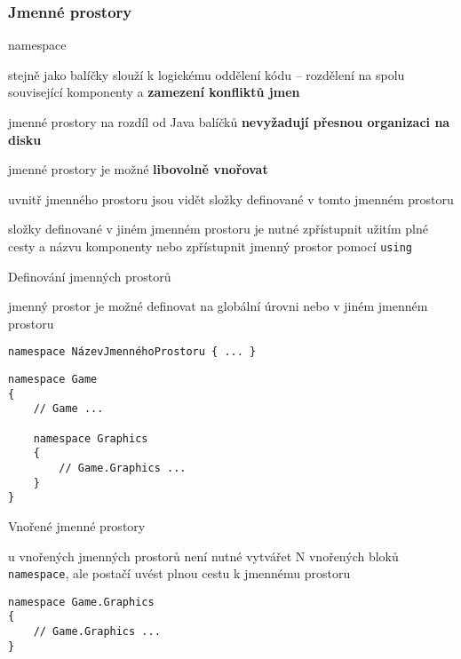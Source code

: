 
\begin{frame}[fragile]
\frametitle{Jmenné prostory}
\vfill
\begin{bitemize}{namespace}
\item stejně jako balíčky slouží k logickému oddělení kódu -- rozdělení na spolu související komponenty a \textbf{zamezení konfliktů jmen}
\item jmenné prostory na rozdíl od Java balíčků \textbf{nevyžadují přesnou organizaci na disku}
\item jmenné prostory je možné \textbf{libovolně vnořovat}
\end{bitemize}
\vfill
\begin{bitemize}{}
\item uvnitř jmenného prostoru jsou vidět složky definované v tomto jmenném prostoru
\item složky definované v jiném jmenném prostoru je nutné zpřístupnit užitím plné cesty a názvu komponenty nebo zpřístupnit jmenný prostor pomocí \lstinline|using|
\end{bitemize}
\vfill
\end{frame}



\begin{frame}[fragile]
\vfill
\begin{bitemize}{Definování jmenných prostorů}
\item jmenný prostor je možné definovat na globální úrovni nebo v jiném jmenném prostoru
\item [] \lstinline|namespace NázevJmennéhoProstoru { ... }|
\end{bitemize}
\vfill
\begin{yesblock}
\begin{lstlisting}
namespace Game
{
    // Game ...

    namespace Graphics
    {
        // Game.Graphics ...
    }
}
\end{lstlisting}
\end{yesblock}
\vfill
\end{frame}





\begin{frame}[fragile]
\vfill
\begin{bitemize}{Vnořené jmenné prostory}
\item u vnořených jmenných prostorů není nutné vytvářet N vnořených bloků \lstinline|namespace|, ale postačí uvést plnou cestu k jmennému prostoru 
\end{bitemize}
\vfill
\begin{yesblock}
\begin{lstlisting}
namespace Game.Graphics
{
    // Game.Graphics ...
}
\end{lstlisting}
\end{yesblock}
\end{frame}




